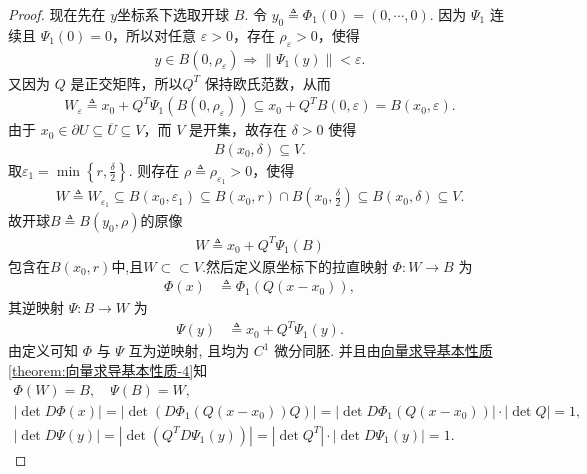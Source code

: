 \documentclass[../../main.tex]{subfiles}%
\begin{document}
\begin{proof}
现在先在 \(y\)坐标系下选取开球 \(B\). 令 \(y_0 \triangleq \Phi_1(0)=(0,\cdots,0)\). 
因为 \(\Psi_1\) 连续且 \(\Psi_1(0)=0\)，所以对任意 \(\varepsilon>0\)，存在 \(\rho_\varepsilon>0\)，使得
\begin{align*}
y\in B(0,\rho_\varepsilon)\Longrightarrow \|\Psi_1(y)\|<\varepsilon.
\end{align*}
又因为 \(Q\) 是正交矩阵，所以\(Q^T\) 保持欧氏范数，从而
\begin{align*}
W_\varepsilon\triangleq x_0+Q^T\Psi_1(B(0,\rho_\varepsilon))
\subseteq x_0+Q^TB(0,\varepsilon)
=B(x_0,\varepsilon).
\end{align*}
由于 \(x_0\in\partial U\subseteq \overline U\subseteq V\)，而 \(V\) 是开集，故存在 \(\delta>0\) 使得
\begin{align*}
B(x_0,\delta)\subseteq V.
\end{align*}
取$\varepsilon_1=\min\left\{r,\frac{\delta}{2}\right\}.$
则存在 \(\rho\triangleq \rho_{\varepsilon_1}>0\)，使得
\begin{align*}
W\triangleq W_{\varepsilon_1}\subseteq B(x_0,\varepsilon_1)\subseteq B(x_0,r)\cap B\left(x_0,\frac{\delta}{2}\right)\subseteq B(x_0,\delta)\subseteq V.
\end{align*}
故开球$B \triangleq B(y_0, \rho)$的原像
\begin{align*}
W\triangleq x_0+Q^T\Psi _1\left( B \right)
\end{align*}
包含在$B\left( x_0,r \right)$中,且$W\subset \subset V$.然后定义原坐标下的拉直映射 \(\Phi: W \to B\) 为
\begin{align*}
\Phi(x) &\triangleq \Phi_1(Q(x - x_0)),
\end{align*}
其逆映射 \(\Psi: B \to W\) 为
\begin{align*}
\Psi(y) &\triangleq x_0 + Q^T \Psi_1(y).
\end{align*}
由定义可知 \(\Phi\) 与 \(\Psi\) 互为逆映射, 且均为 \(C^1\) 微分同胚. 并且由\hyperref[theorem:向量求导基本性质]{向量求导基本性质\ref{theorem:向量求导基本性质-4}}知
\begin{gather}
\Phi(W) = B, \quad \Psi(B) = W,\label{eq::jifjiojiojiojiomfijsfiojjsifjioejiojmwfiejfiwmfiowijijwfio-1}\\
\left| \det D\Phi \left( x \right) \right|=\left| \det \left( D\Phi _1\left( Q\left( x-x_0 \right) \right) Q \right) \right|=\left| \det D\Phi _1\left( Q\left( x-x_0 \right) \right) \right|\cdot \left| \det Q \right|=1,\label{eq::jifjiojiojiojiomfijsfiojjsifjioejiojmwfiejfiwmfiowijijwfio-2}
\\
\left| \det D\Psi \left( y \right) \right|=\left| \det \left( Q^TD\Psi _1\left( y \right) \right) \right|=\left| \det Q^T \right|\cdot \left| \det D\Psi _1\left( y \right) \right|=1.\label{eq::jifjiojiojiojiomfijsfiojjsifjioejiojmwfiejfiwmfiowijijwfio-3}
\end{gather}


\end{proof}
\end{document}
